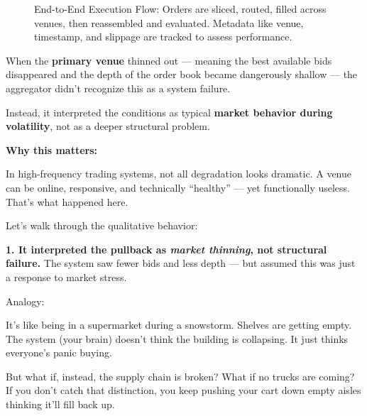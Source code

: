\begin{figure}[H]
{%
  }
  \caption{End-to-End Execution Flow: Orders are sliced, routed, filled across venues, then reassembled and evaluated. Metadata like venue, timestamp, and slippage are tracked to assess performance.}
\end{figure}




















When the \textbf{primary venue} thinned out — meaning the best available bids disappeared and the depth of the 
order book became dangerously shallow — the aggregator didn’t recognize this as a system failure.

Instead, it interpreted the conditions as typical \textbf{market behavior during volatility}, not as a deeper 
structural problem.

\textbf{Why this matters:}

In high-frequency trading systems, not all degradation looks dramatic. A venue can be online, responsive, and 
technically “healthy” — yet functionally useless. That’s what happened here.

Let’s walk through the qualitative behavior:

\textbf{1. It interpreted the pullback as \emph{market thinning}, not structural failure.}
The system saw fewer bids and less depth — but assumed this was just a response to market stress.

Analogy:

It’s like being in a supermarket during a snowstorm. Shelves are getting empty. The system (your brain) doesn’t 
think the building is collapsing. It just thinks everyone’s panic buying.

But what if, instead, the supply chain is broken? What if no trucks are coming? If you don’t catch that distinction, 
you keep pushing your cart down empty aisles thinking it’ll fill back up.

